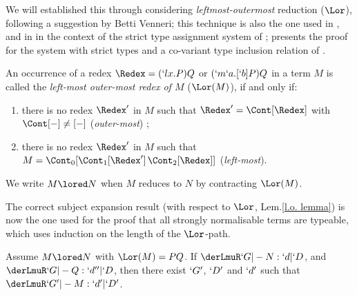 \documentclass{CSML}
\begin{document}
We will established this through considering \emph{leftmost-outermost} reduction ($\Lor$), following a suggestion by Betti Venneri; this technique is also the one used in \cite{Krivine-book'93}, and in \cite{Bakel-NDJFL'04} in the context of the strict type assignment system of \cite{Bakel-TCS'92}; \cite{Bakel-ACM'11} presents the proof for the system with strict types and a co-variant type inclusion relation of \cite{Bakel-TCS'95}.

 \begin {defi} %
An occurrence of a redex $\Redex = ( `l x.P)Q$ or $(`m`a.[`b]P)Q$ in a term $M$ is called the \emph{left-most outer-most redex of $M$} ($\Lor(M)$), if and only if:

 \begin {enumerate}
 \item there is no redex $\Redex'$ in $M$ such that $\Redex' = \Cont[ \Redex ] $
with $\Cont[ - ]\not= [-]$ (\emph{outer-most}) ;
 \item there is no redex $\Redex'$ in $M$ such that $M = \Cont_{0}[{ \Cont_{1}[\Redex'] \, \Cont_{2}[ \Redex ]}] $ (\emph{left-most}).
 \end {enumerate}
We write $M \lored N$ when $M$ reduces to $N$ by contracting $\Lor(M)$.
 \end {defi}

The correct subject expansion result (with respect to $\Lor$, Lem.\skp\ref{l.o. lemma}) is now the one used for the proof that all strongly normalisable terms are typeable, which uses induction on the length of the $\Lor$-path.


 \begin {lem} \label {l.o. lemma}
Assume $M \lored N$ with $\Lor(M) = PQ$. 
If $\derLmuR `G |- N : `d | `D $, and 
 $\derLmuR `G |- Q : `d'' | `D $,
then there exist $`G'$, $`D'$ and $`d'$ such that $\derLmuR `G' |- M : `d' | `D' $.
 \end{lem}
\end{document}
